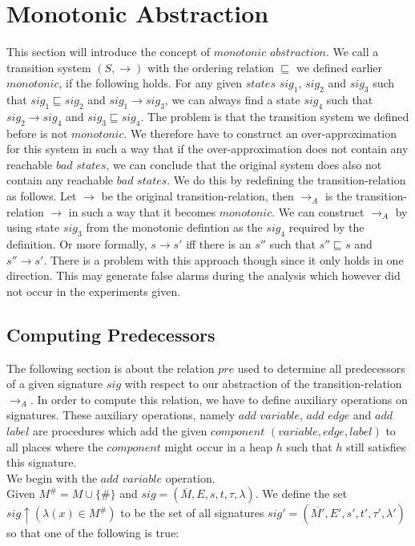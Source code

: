 \section{Monotonic Abstraction}
This section will introduce the concept of $monotonic$ $abstraction$. We call a transition system $(S, \longrightarrow)$ with
the ordering relation $\sqsubseteq$ we defined earlier $monotonic$, if the following holds. For any given $states$ $sig_1$, $sig_2$
and $sig_3$ such that $sig_1 \sqsubseteq sig_2$ and $sig_1 \longrightarrow sig_3$, we can always find a state $sig_4$ such that
$sig_2 \longrightarrow sig_4$ and $sig_3 \sqsubseteq sig_4$.
The problem is that the transition system we defined before is not $monotonic$. We therefore have to construct an over-approximation
for this system in such a way that if the over-approximation does not contain any reachable $bad$ $states$, we can conclude that
the original system does also not contain any reachable $bad$ $states$. We do this by redefining the transition-relation as follows.
Let $\longrightarrow$ be the original transition-relation, then $\longrightarrow_A$ is the transition-relation $\longrightarrow$
in such a way that it becomes $monotonic$. We can construct $\longrightarrow_A$ by using state $sig_3$ from the monotonic defintion
as the $sig_4$ required by the definition. Or more formally, $s \longrightarrow s'$ iff there is an $s''$ such that $s'' \sqsubseteq s$
and $s'' \longrightarrow s'$. There is a problem with this approach though since it only holds in one direction. 
This may generate false alarms during the analysis which however did not occur in the experiments given. 

\subsection{Computing Predecessors}
The following section is about the relation $pre$ used to determine all predecessors of a given signature $sig$ with respect to
our abstraction of the transition-relation $\longrightarrow_A$. In order to compute this relation, we have to define auxiliary 
operations on signatures. These auxiliary operations, namely $add$ $variable$, $add$ $edge$ and $add$ $label$ are procedures
which add the given $component$ $(variable, edge, label)$ to all places where the $component$ might occur in a heap $h$ such that
$h$ still satisfies this signature. \\
We begin with the $add$ $variable$ operation.\\
Given $M^{\#} = M \cup \{\#\}$ and $sig = (\overline{M}, E, s, t, \tau, \lambda)$. We define the set 
$sig \uparrow(\lambda(x) \in M^{\#})$ to be the set of all signatures $sig'=(\overline{M'}, E', s', t', \tau', \lambda')$ 
so that one of the following is true:

